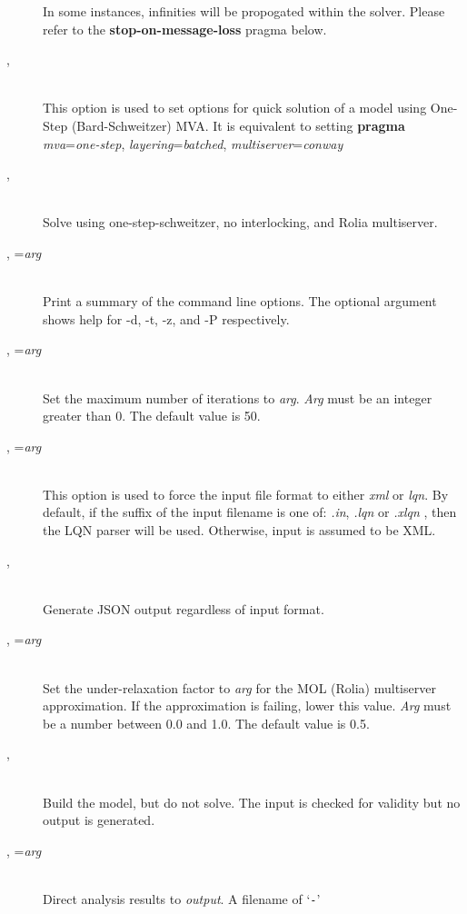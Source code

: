 \begin{description}
In some instances, infinities  will be propogated within the solver.  Please refer to the
\textbf{stop-on-message-loss} pragma below.
\item[\flag{f}{}, \longopt{fast-linearizer}]~\\
This option is used to set options for quick solution of a model using One-Step (Bard-Schweitzer) MVA.
It is equivalent to setting \textbf{pragma} \emph{mva}=\emph{one-step}, \emph{layering}=\emph{batched}, \emph{multiserver}=\emph{conway}
\item[\flag{h}{}, \longopt{huge}]~\\
Solve using one-step-schweitzer, no interlocking, and Rolia multiserver.
\item[\flag{H}{}, \longopt{help}=\emph{arg}]~\\
Print a summary of the command line options.  The optional argument shows help for -d, -t, -z, and -P respectively.
\item[\flag{i}{}, \longopt{iteration-limit}=\emph{arg}]~\\
Set the maximum number of iterations to \emph{arg}.
\emph{Arg} must be an integer greater than 0.  The default value is 50.
\item[\flag{I}{}, \longopt{input-format}=\emph{arg}]~\\
This option is used to force the input file format to either \emph{xml} or \emph{lqn}.
By default, if the suffix of the input filename is one of: \emph{.in}, \emph{.lqn} or \emph{.xlqn}
, then the LQN parser will be used.  Otherwise, input is assumed to be XML.
\item[\flag{j}{}, \longopt{json}]~\\
Generate JSON output regardless of input format.
\item[\flag{M}{}, \longopt{mol-underrelaxation}=\emph{arg}]~\\
Set the under-relaxation factor to \emph{arg} for the MOL (Rolia) multiserver approximation.  If the approximation is failing, lower this value.
\emph{Arg} must be a number between 0.0 and 1.0.
The default value is 0.5.
\item[\flag{n}{}, \longopt{no-execute}]~\\
Build the model, but do not solve.
The input is checked for validity but no output is generated.
\item[\flag{o}{}, \longopt{output}=\emph{arg}]~\\
Direct analysis results to \emph{output}.  A filename of `\texttt{-}'

\end{description}
